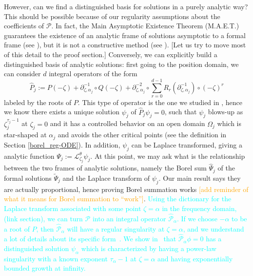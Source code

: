 \documentclass{article}
\newcommand{\series}[1]{\tilde{#1}}
\newcommand{\laplace}{\mathcal{L}}
\theoremstyle{definition}
\theoremstyle{plain}
\begin{document}
However, can we find a distinguished basis for solutions in a purely analytic way? This should be possible because of our regularity assumptions about the coefficients of $\mathcal{P}$. In fact, the Main Asymptotic Existence Theorem (M.A.E.T.) guarantees the existence of an analytic frame of solutions asymptotic to a formal frame (see \cite[Theorem 3.1]{diverg-resurg-iii}), but it is not a constructive method (see \cite[Chapter 14]{balser}). \color{black} \color{Goldenrod}[Let us try to move most of this detail to the proof section.] Conversely, we can explicitly build a distinguished basis of analytic solutions: first going to the position domain, we can consider $d$ integral operators of the form 
\begin{equation}
\hat{P}_j:=P(-\zeta)+\partial_{\zeta,\alpha_j}^{-1}\circ Q(-\zeta)+\partial_{\zeta,\alpha_j}^{-2}\circ\sum_{r=0}^{d-1}R_r(\partial_{\zeta,\alpha_j}^{-1})\circ (-\zeta)^r
\end{equation}
labeled by the roots of $P$. This type of operator is the one we studied in \cite{reg-sing-volterra}, hence we know there exists a unique solution $\psi_j$ of $\hat{P}_j\psi_j=0$, such that $\psi_j$ blows-up as $\zeta_j^{\tau_j-1}$ at $\zeta_j=0$ and it has a controlled behavior on an open domain $\Omega_j$ which is star-shaped at $\alpha_j$ and avoids the other critical points (see the definition in Section \ref{borel_reg-ODE}). In addition, $\psi_j$ can be Laplace transformed, giving a analytic function $\Psi_j:=\laplace_{\zeta_j}^{\theta}\psi_j$. 
At this point, we may ask what is the relationship between the two frames of analytic solutions, namely the Borel sum $\hat{\Psi}_j$ of the formal solutions $\series{\Psi}_j$ and the Laplace transform of $\psi_j$. Our main result says they are actually proportional, hence proving Borel summation works \textcolor{orange}{[add reminder of what it means for Borel summation to ``work'']}.\color{black}
\textcolor{Cyan}{Using the dictionary for the Laplace transform associated with some point $\zeta = \alpha$ in the frequency domain, (link section), we can turn $\mathcal{P}$ into an integral operator $\hat{\mathcal{P}}_\alpha$. If we choose $-\alpha$ to be a root of $P$, then $\hat{\mathcal{P}}_\alpha$ will have a regular singularity at $\zeta = \alpha$, and we understand a lot of details about its specific form~\cite{reg-sing-volterra}. We show in~\cite{reg-sing-volterra} that $\hat{\mathcal{P}}_\alpha \phi = 0$ has a distinguished solution $\psi_\alpha$ which is characterized by having a power-law singularity with a known exponent $\tau_\alpha - 1$ at $\zeta = \alpha$ and having exponentially bounded growth at infinity.}
\end{document}
